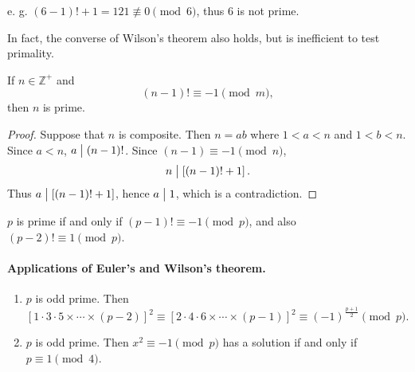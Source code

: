 e. g. $\left(6-1\right)!+1=121\not\equiv 0\pmod{6}$, thus 6 is not prime.

In fact, the converse of Wilson's theorem also holds,
but is inefficient to test primality.

\begin{theorem}
    If $n\in\mathbb{Z}^+$ and
    \[
        \left(n-1\right)!\equiv -1 \pmod{m},
    \]
    then $n$ is prime.
\end{theorem}

\begin{proof}
    Suppose that $n$ is composite. Then $n=ab$ where $1<a<n$ and $1<b<n$.
    Since $a<n$, $a \bigm| \left(n-1\right)!$.
    Since $\left(n-1\right)\equiv -1\pmod{n}$,
    \[
        n \bigm| \left[\left(n-1\right)!+1\right].
    \]
    Thus $a \bigm| \left[\left(n-1\right)!+1\right]$, hence $a \bigm| 1$,
    which is a contradiction.
\end{proof}

\begin{remark}
    $p$ is prime if and only if $\left(p-1\right)! \equiv -1\pmod{p}$,
    and also $\left(p-2\right)! \equiv 1\pmod{p}$.
\end{remark}

\paragraph{Applications of Euler's and Wilson's theorem.}
\begin{enumerate}
    \item $p$ is odd prime. Then 
    \[
        \left[1\cdot 3\cdot 5 \times \cdots \times \left(p-2\right)\right]^2
        \equiv \left[2\cdot 4\cdot 6 \times \cdots \times \left(p-1\right)\right]^2
        \equiv \left(-1\right)^{\frac{p+1}{2}} \pmod{p}.
    \]
    \item $p$ is odd prime. Then $x^2 \equiv -1\pmod{p}$
    has a solution if and only if $p \equiv 1\pmod{4}$.
\end{enumerate}